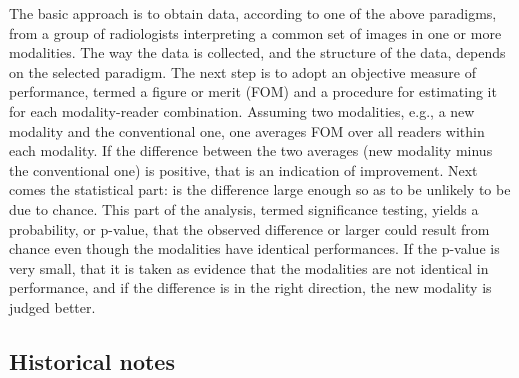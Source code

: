 \documentclass[
]{book}
\begin{document}
The basic approach is to obtain data, according to one of the above paradigms, from a group of radiologists interpreting a common set of images in one or more modalities. The way the data is collected, and the structure of the data, depends on the selected paradigm. The next step is to adopt an objective measure of performance, termed a figure or merit (FOM) and a procedure for estimating it for each modality-reader combination. Assuming two modalities, e.g., a new modality and the conventional one, one averages FOM over all readers within each modality. If the difference between the two averages (new modality minus the conventional one) is positive, that is an indication of improvement. Next comes the statistical part: is the difference large enough so as to be unlikely to be due to chance. This part of the analysis, termed significance testing, yields a probability, or p-value, that the observed difference or larger could result from chance even though the modalities have identical performances. If the p-value is very small, that it is taken as evidence that the modalities are not identical in performance, and if the difference is in the right direction, the new modality is judged better.

\hypertarget{historical-notes}{%
\subsection{Historical notes}\label{historical-notes}}
\end{document}
